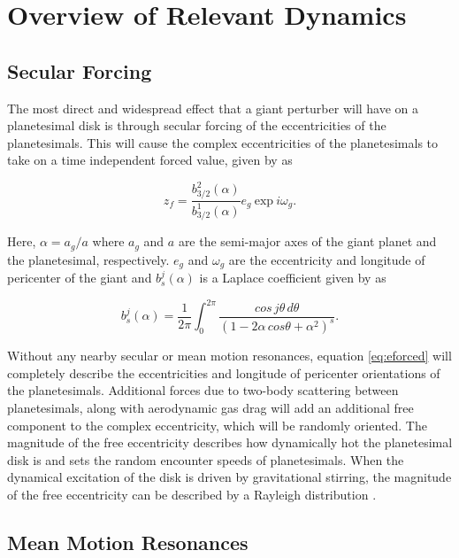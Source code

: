 \documentclass[twocolumn]{aastex63}
\begin{document}
\section{Overview of Relevant Dynamics} \label{sec:dynamics}

\subsection{Secular Forcing}\label{sec:sec_force}

The most direct and widespread effect that a giant perturber will have on a planetesimal disk is through secular forcing of the 
eccentricities of the planetesimals. This will cause the complex eccentricities of the planetesimals to take on a time independent 
forced value, given by \citep{1999ApJ...527..918W} as

\begin{equation}\label{eq:eforced}
	z_{f} = \frac{b^{2}_{3/2} (\alpha)}{b^{1}_{3/2} (\alpha)} e_{g} ~ \mathrm{exp} ~ i \omega_{g}.
\end{equation}

\noindent Here, $\alpha = a_{g} / a$ where $a_{g}$ and $a$ are the semi-major axes of the giant planet and the planetesimal, 
respectively. $e_{g}$ and $\omega_{g}$ are the eccentricity and longitude of pericenter of the giant and $b^{j}_{s} (\alpha)$ is a 
Laplace coefficient given by \citep{2000ssd..book.....M} as

\begin{equation}\label{eq:lap}
	b_{s}^{j}(\alpha) = \frac{1}{2 \pi} \int_{0}^{2 \pi} \frac{cos \, j \theta \, d \theta}{\left( 1 - 2 \alpha \, cos \theta + \alpha^2 \right)^{s}}.
\end{equation}

Without any nearby secular or mean motion resonances, equation \ref{eq:eforced} will completely describe the eccentricities and longitude of  
pericenter orientations of the planetesimals. Additional forces due to two-body scattering between planetesimals, along with 
aerodynamic gas drag will add an additional free component to the complex eccentricity, which will be randomly oriented. The 
magnitude of the free eccentricity describes how dynamically hot the planetesimal disk is and sets the random encounter speeds of 
planetesimals. When the dynamical excitation of the disk is driven by gravitational stirring, the magnitude of the free eccentricity can 
be described by a Rayleigh distribution \citep{1992Icar...96..107I}.

\subsection{Mean Motion Resonances}
\end{document}
